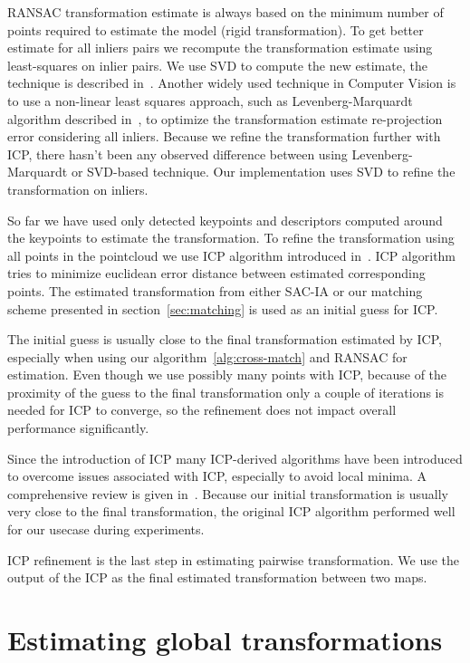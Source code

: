 \gls{RANSAC} transformation estimate is always based on the minimum number of points required to estimate the model (rigid transformation). To get better estimate for all inliers pairs we recompute the transformation estimate using least-squares on inlier pairs. We use \gls{SVD} to compute the new estimate, the technique is described in~\cite{golub1970svd}. Another widely used technique in Computer Vision is to use a non-linear least squares approach, such as Levenberg-Marquardt algorithm described in~\cite{more1978levmarq}, to optimize the transformation estimate re-projection error considering all inliers. Because we refine the transformation further with \gls{ICP}, there hasn't been any observed difference between using Levenberg-Marquardt or \gls{SVD}-based technique. Our implementation uses \gls{SVD} to refine the transformation on inliers.

So far we have used only detected keypoints and descriptors computed around the keypoints to estimate the transformation. To refine the transformation using all points in the pointcloud we use \gls{ICP} algorithm introduced in~\cite{besl1992icp}. \gls{ICP} algorithm tries to minimize euclidean error distance between estimated corresponding points. The estimated transformation from either \gls{SAC-IA} or our matching scheme presented in section~\ref{sec:matching} is used as an initial guess for \gls{ICP}.

The initial guess is usually close to the final transformation estimated by \gls{ICP}, especially when using our algorithm~\ref{alg:cross-match} and \gls{RANSAC} for estimation. Even though we use possibly many points with \gls{ICP}, because of the proximity of the guess to the final transformation only a couple of iterations is needed for \gls{ICP} to converge, so the refinement does not impact overall performance significantly.

Since the introduction of \gls{ICP} many \gls{ICP}-derived algorithms have been introduced to overcome issues associated with \gls{ICP}, especially to avoid local minima. A comprehensive review is given in~\cite{pomerleau2015reviewregistration}. Because our initial transformation is usually very close to the final transformation, the original \gls{ICP} algorithm performed well for our usecase during experiments.

\gls{ICP} refinement is the last step in estimating pairwise transformation. We use the output of the \gls{ICP} as the final estimated transformation between two maps.

\section{Estimating global transformations}
\label{sec:estimate-global}

